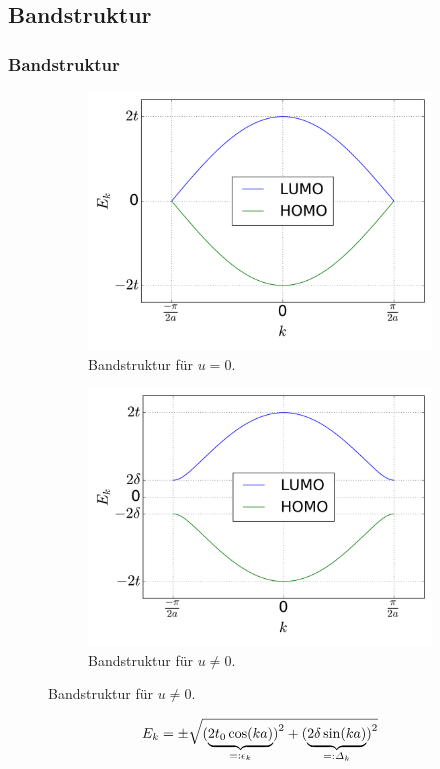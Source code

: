 \subsection{Bandstruktur}
\begin{frame}
\frametitle{Bandstruktur}
\begin{figure}
	\centering
	\vspace*{-.5cm}
	\begin{subfigure}{0.49\textwidth}
		\includegraphics[width =\textwidth]{Images/Plots/bandstructure_without_gap}
		\caption{Bandstruktur für $u = 0$.}
		\label{image_bs_wo_gap}
	\end{subfigure}\hspace*{0.2cm}
	\begin{subfigure}{0.49\textwidth}
		\includegraphics[width = \textwidth]{Images/Plots/bandstructure_with_gap}
		\caption{Bandstruktur für $u \neq 0$.}
		\label{image_bs_w_gap}
	\end{subfigure}
\end{figure}
\begin{align*}
	E_k = \pm \sqrt{\left(\smash[b]{\underbrace{2t_0\cos(ka)}_{=:\epsilon_k}}\right)^2 + \left(\smash[b]{\underbrace{2\delta\sin(ka)}_{=:\Delta_k}}\right)^2}
\end{align*}
\end{frame}
